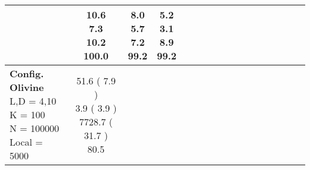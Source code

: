 \documentclass[9pt]{article}
\begin{document}
\begin{landscape}
\begin{longtable}{ l | c c c c | c c c c | c c c c | c c c c |}
             &
                            \makecell{              10.6
     \\
            {\footnotesize             7.3
    } \\  {\footnotesize             10.2
     } \\
            {\small \textcolor[rgb]{ 0.2 , 0.699 , 0.1} {100.0  }
} }
             &                         \makecell{              8.0
     \\
            {\footnotesize             5.7
    } \\  {\footnotesize             7.2
     } \\
            {\small \textcolor[rgb]{ 0.216 , 0.683 , 0.1} {99.2  }
} }
             &
                            \makecell{              \textbf{ 5.2 }
     \\
            {\footnotesize             \textbf{ 3.1 }
    } \\  {\footnotesize             8.9
     } \\
            {\small \textcolor[rgb]{ 0.216 , 0.683 , 0.1} {99.2  }
} }
            

 \\
                                                            
                    \hline
                    \makecell{ \textbf{ Config. Olivine} \\
                    { \small L,D = 4,10} \\
                    {\small K = 100} \\
                    {\small N = 100000 } \\ {\small Local = 5000 }} &
                    
                            \makecell{              51.6
     (             7.9
    ) \\
            {\footnotesize             3.9
     (              3.9
     )} \\
            {\footnotesize             7728.7
     (            31.7
    ) } \\
            {\small  \textcolor[rgb]{ 0.59 , 0.31 , 0.1} {80.5  }
} }



\end{longtable}
\end{landscape}
\end{document}
